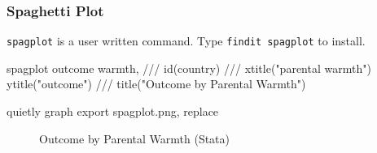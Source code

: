 \documentclass[
  letterpaper,
  DIV=11,
  numbers=noendperiod]{scrreprt}
\newenvironment{Shaded}{\begin{snugshade}}{\end{snugshade}}
\newcommand{\BaseNTok}[1]{\textcolor[rgb]{0.68,0.00,0.00}{#1}}
\newcommand{\CommentTok}[1]{\textcolor[rgb]{0.37,0.37,0.37}{#1}}
\newcommand{\KeywordTok}[1]{\textcolor[rgb]{0.00,0.23,0.31}{#1}}
\newcommand{\NormalTok}[1]{\textcolor[rgb]{0.00,0.23,0.31}{#1}}
\newcommand{\StringTok}[1]{\textcolor[rgb]{0.13,0.47,0.30}{#1}}
\begin{document}
\subsubsection{Spaghetti Plot}\label{spaghetti-plot}

\begin{tcolorbox}[enhanced jigsaw, coltitle=black, opacityback=0, title=\textcolor{quarto-callout-tip-color}{\faLightbulb}\hspace{0.5em}{Installing \texttt{spagplot}}, toprule=.15mm, colback=white, bottomrule=.15mm, colbacktitle=quarto-callout-tip-color!10!white, breakable, bottomtitle=1mm, arc=.35mm, left=2mm, colframe=quarto-callout-tip-color-frame, opacitybacktitle=0.6, leftrule=.75mm, titlerule=0mm, rightrule=.15mm, toptitle=1mm]

\texttt{spagplot} is a user written command. Type
\texttt{findit\ spagplot} to install.

\end{tcolorbox}

\begin{Shaded}
\begin{Highlighting}[]
\NormalTok{spagplot outcome warmth, }\CommentTok{///}
\NormalTok{  id(country) }\CommentTok{///}
  \BaseNTok{xtitle}\NormalTok{(}\StringTok{"parental warmth"}\NormalTok{) }\BaseNTok{ytitle}\NormalTok{(}\StringTok{"outcome"}\NormalTok{) }\CommentTok{///}
  \BaseNTok{title}\NormalTok{(}\StringTok{"Outcome by Parental Warmth"}\NormalTok{) }

\KeywordTok{quietly} \KeywordTok{graph} \KeywordTok{export}\NormalTok{ spagplot.png, }\KeywordTok{replace}
\end{Highlighting}
\end{Shaded}

\begin{figure}


\caption{\label{fig-Stataspagplot}Outcome by Parental Warmth (Stata)}

\end{figure}%
\end{document}
